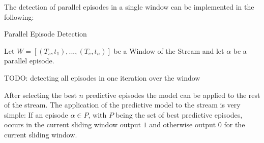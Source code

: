 The detection of parallel episodes in a single window can be implemented in the following:

\begin{algorithm}[H]
  \caption{Parallel Episode Detection
    \label{alg_ParallelEpisodeDetection}}
  \begin{algorithmic}[1]
    \Statex
    \Require Let $W=[(T_s,t_1),...,(T_e,t_n)]$ be a Window of the Stream and let $\alpha$ be a parallel episode.
      	\EndFor      
        \EndIf
      \EndWhile
      \State {}
    \EndFunction
  \end{algorithmic}
\end{algorithm}

TODO: detecting all episodes in one iteration over the window


After selecting the best $n$ predictive episodes the model can be applied to the rest of the stream.
The application of the predictive model to the stream is very simple: If an episode $\alpha \in P$, with $P$ being the set of best predictive episodes, occurs in the current sliding window output $1$ and otherwise output $0$ for the current sliding window.

